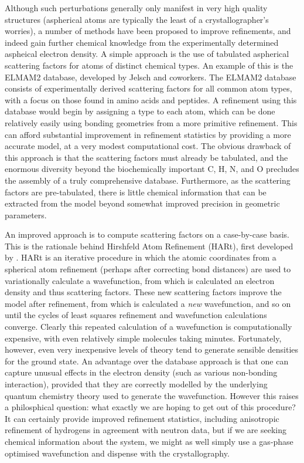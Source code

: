 \begin{refsection}
Although such perturbations generally only manifest in very high quality structures (aspherical atoms are typically the least of a crystallographer's worries), a number of methods have been proposed to improve refinements, and indeed gain further chemical knowledge from the experimentally determined aspheical electron density.
A simple approach is the use of tabulated aspherical scattering factors for atoms of distinct chemical types.
An example of this is the ELMAM2 database, developed by Jelsch and coworkers.\autocite{Domagaa2012}
The ELMAM2 database consists of experimentally derived scattering factors for all common atom types, with a focus on those found in amino acids and peptides.
A refinement using this database would begin by assigning a type to each atom, which can be done relatively easily using bonding geometries from a more primitive refinement.
This can afford substantial improvement in refinement statistics by providing a more accurate model, at a very modest computational cost.
The obvious drawback of this approach is that the scattering factors must already be tabulated, and the enormous diversity beyond the biochemically important C, H, N, and O precludes the assembly of a truly comprehensive database.
Furthermore, as the scattering factors are pre-tabulated, there is little chemical information that can be extracted from the model beyond somewhat improved precision in geometric parameters.

An improved approach is to compute scattering factors on a case-by-case basis.
This is the rationale behind Hirshfeld Atom Refinement (HARt), first developed by \citeauthor{Jayatilaka2008}.\autocite{Jayatilaka2008}
HARt is an iterative procedure in which the atomic coordinates from a spherical atom refinement (perhaps after correcting  bond distances) are used to variationally calculate a wavefunction, from which is calculated an electron density and thus scattering factors.
These new scattering factors improve the model after refinement, from which is calculated a \emph{new} wavefunction, and so on until the cycles of least squares refinement and wavefunction calculations converge.
Clearly this repeated calculation of a wavefunction is computationally expensive, with even relatively simple molecules taking minutes.
Fortunately, however, even very inexpensive levels of theory tend to generate sensible densities for the ground state.
An advantage over the database approach is that one can capture unusual effects in the electron density (such as various non-bonding interaction), provided that they are correctly modelled by the underlying quantum chemistry theory used to generate the wavefunction.
However this raises a philosphical question: what exactly we are hoping to get out of this procedure?
It can certainly provide improved refinement statistics, including anisotropic refinement of hydrogens in agreement with neutron data, but if we are seeking chemical information about the system, we might as well simply use a gas-phase optimised wavefunction and dispense with the crystallography.


\end{refsection}
